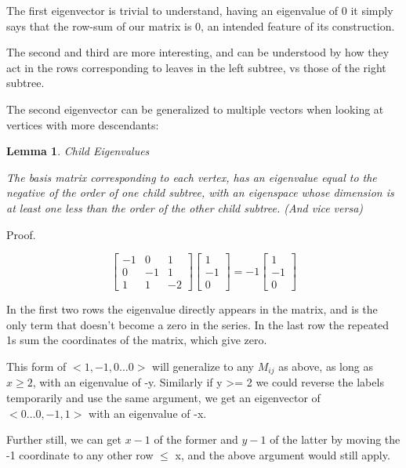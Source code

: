 \documentclass[10pt,a4paper]{report}
\newtheorem{lemma}{Lemma}
\begin{document}
The first eigenvector is trivial to understand, having an eigenvalue of 0 it
simply says that the row-sum of our matrix is 0, an intended feature of its
construction.

The second and third are more interesting, and can be understood by how they
act in the rows corresponding to leaves in the left subtree, vs those of the
right subtree.

The second eigenvector can be generalized to multiple vectors when looking at
vertices with more descendants:

\begin{lemma} Child Eigenvalues

	The basis matrix corresponding to each vertex, has an eigenvalue equal to the
	negative of the order of one child subtree, with an eigenspace whose
	dimension is at least one less than the order of the other child subtree.
	(And vice versa)
\end{lemma}

Proof.

\begin{equation*}
\left[\begin{matrix}
	-1 & 0 & 1\\
	0 & -1 & 1\\
	1 & 1 & -2
\end{matrix}\right]
\left[\begin{matrix}
	1\\
	-1\\
	0
\end{matrix}\right]
=
-1
\left[\begin{matrix}
	1\\
	-1\\
	0
\end{matrix}\right]
\end{equation*}

In the first two rows the eigenvalue directly appears in the matrix, and is the
only term that doesn't become a zero in the series.
In the last row the repeated 1s sum the coordinates of the matrix, which give
zero.

This form of $<1, -1, 0\ldots 0>$ will generalize to any $M_{ij}$ as above, as
long as $x \geq 2$, with an eigenvalue of -y.
Similarly if y >= 2 we could reverse the labels temporarily and use the same
argument, we get an eigenvector of $<0\ldots 0, -1, 1>$ with an eigenvalue of
-x.

Further still, we can get $x-1$ of the former and $y-1$ of the latter by moving
the -1 coordinate to any other row $\leq$ x, and the above argument would still
apply.
\end{document}
